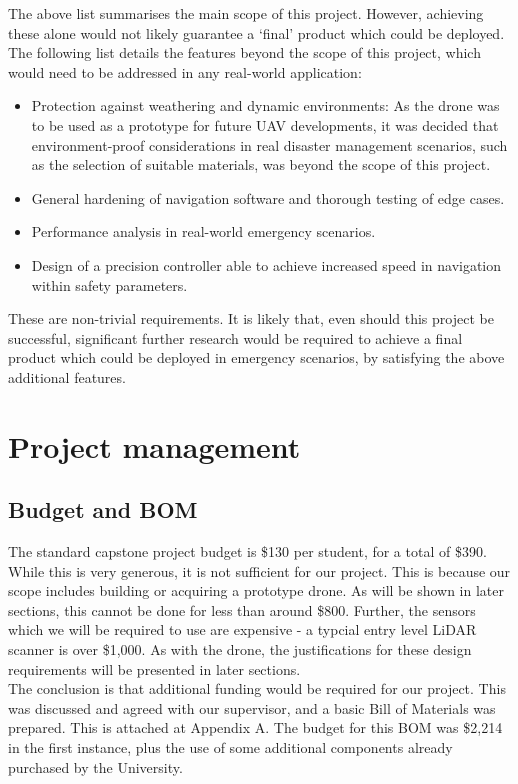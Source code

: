 \documentclass[capstone_report.tex]{subfiles}
\begin{document}
The above list summarises the main scope of this project. However, achieving these alone would not likely guarantee a `final' product which could be deployed. The following list details the features beyond the scope of this project, which would need to be addressed in any real-world application:
\begin{itemize}
	\item Protection against weathering and dynamic environments: As the drone was to be used as a prototype for future UAV developments, it was decided that environment-proof considerations in real disaster management scenarios, such as the selection of suitable materials, was beyond the scope of this project.
    \item General hardening of navigation software and thorough testing of edge cases.
    \item Performance analysis in real-world emergency scenarios.
    \item Design of a precision controller able to achieve increased speed in navigation within safety parameters.
\end{itemize}

These are non-trivial requirements. It is likely that, even should this project be successful, significant further research would be required to achieve a final product which could be deployed in emergency scenarios, by satisfying the above additional features.


\section{Project management}
\subsection{Budget and BOM}
The standard capstone project budget is \$130 per student, for a total of \$390. While this is very generous, it is not sufficient for our project. This is because our scope includes building or acquiring a prototype drone. As will be shown in later sections, this cannot be done for less than around \$800. Further, the sensors which we will be required to use are expensive - a typcial entry level LiDAR scanner is over \$1,000. As with the drone, the justifications for these design requirements will be presented in later sections.\\

The conclusion is that additional funding would be required for our project. This was discussed and agreed with our supervisor, and a basic Bill of Materials was prepared. This is attached at Appendix A. The budget for this BOM was \$2,214 in the first instance, plus the use of some additional components already purchased by the University.\\
\end{document}
